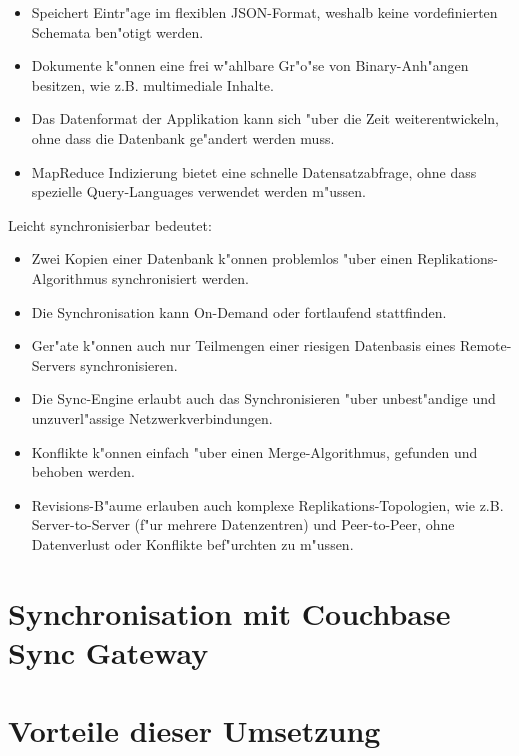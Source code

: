 \documentclass[a4paper,14pt]{scrreprt}
\begin{document}
\begin{itemize}
\item Speichert Eintr"age im flexiblen JSON-Format, weshalb keine vordefinierten Schemata ben"otigt werden.
\item Dokumente k"onnen eine frei w"ahlbare Gr"o"se von Binary-Anh"angen besitzen, wie z.B. multimediale Inhalte.
\item Das Datenformat der Applikation kann sich "uber die Zeit weiterentwickeln, ohne dass die Datenbank ge"andert werden muss.
\item MapReduce Indizierung bietet eine schnelle Datensatzabfrage, ohne dass spezielle Query-Languages verwendet werden m"ussen.
\end{itemize}
Leicht synchronisierbar bedeutet:
\begin{itemize}
\item Zwei Kopien einer Datenbank k"onnen problemlos "uber einen Replikations-Algorithmus synchronisiert werden.
\item Die Synchronisation kann On-Demand oder fortlaufend stattfinden.
\item Ger"ate k"onnen auch nur Teilmengen einer riesigen Datenbasis eines Remote-Servers synchronisieren.
\item Die Sync-Engine erlaubt auch das Synchronisieren "uber unbest"andige und unzuverl"assige Netzwerkverbindungen.
\item Konflikte k"onnen einfach "uber einen Merge-Algorithmus, gefunden und behoben werden.
\item Revisions-B"aume erlauben auch komplexe Replikations-Topologien, wie z.B. Server-to-Server (f"ur mehrere Datenzentren) und Peer-to-Peer, ohne Datenverlust oder Konflikte bef"urchten zu m"ussen.
\end{itemize}
\cite{couch1}
\section{Synchronisation mit Couchbase Sync Gateway}
\cite{sync1}
\section{Vorteile dieser Umsetzung}

\end{document}
